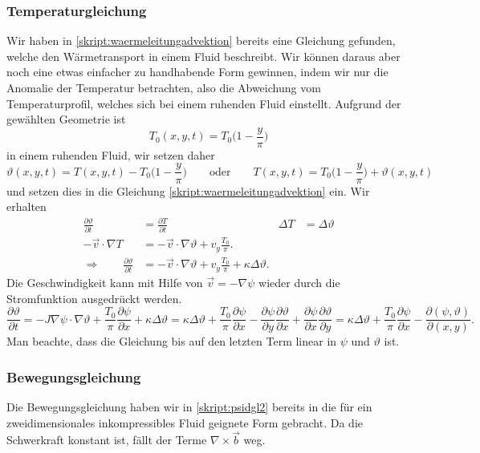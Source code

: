 \subsubsection{Temperaturgleichung}
Wir haben in \eqref{skript:waermeleitungadvektion}
bereits eine Gleichung gefunden, welche den Wärmetransport in einem 
Fluid beschreibt.
Wir können daraus aber noch eine etwas einfacher zu handhabende Form
gewinnen, indem wir nur die Anomalie der Temperatur betrachten, also
die Abweichung vom Temperaturprofil, welches sich bei einem ruhenden
Fluid einstellt. 
Aufgrund der gewählten Geometrie ist 
\[
T_0(x,y,t)= T_0\biggl(1- \frac{y}{\pi}\biggr)
\]
in einem ruhenden Fluid, wir setzen daher
\[
\vartheta(x,y,t)
= 
T(x,y,t)
-
T_0\biggl(1-\frac{y}{\pi}\biggr)
\qquad\text{oder}\qquad
T(x,y,t)
=
T_0\biggl(1-\frac{y}{\pi}\biggr)
+
\vartheta(x,y,t)
\]
und setzen dies in die Gleichung \eqref{skript:waermeleitungadvektion}
ein.
Wir erhalten
\begin{align*}
\frac{\partial\vartheta}{\partial t}
&=
\frac{\partial T}{\partial t}
&
\Delta T
&=
\Delta \vartheta
\\
-\vec{v}\cdot\nabla T
&=
-\vec{v}\cdot\nabla\vartheta
+v_y\frac{T_0}{\pi}.
\\
\Rightarrow
\qquad
\frac{\partial\vartheta}{\partial t}
&=
-\vec{v}\cdot\nabla \vartheta
+v_y\frac{T_0}{\pi}
+
\kappa\Delta \vartheta.
\end{align*}
Die Geschwindigkeit kann mit Hilfe von $\vec{v}=-\nabla \psi$ wieder
durch die Stromfunktion ausgedrückt werden.
\begin{equation}
\frac{\partial\vartheta}{\partial t}
=
-J\nabla\psi\cdot\nabla\vartheta
+\frac{T_0}{\pi}\frac{\partial\psi}{\partial x}
+\kappa\Delta\vartheta
=
\kappa\Delta\vartheta
+\frac{T_0}{\pi}\frac{\partial\psi}{\partial x}
-\frac{\partial \psi}{\partial y}\frac{\partial \vartheta}{\partial x}
+\frac{\partial \psi}{\partial x}\frac{\partial \vartheta}{\partial y}
=
\kappa\Delta\vartheta
+\frac{T_0}{\pi}\frac{\partial\psi}{\partial x}
-
\frac{\partial(\psi,\vartheta)}{\partial(x,y)}.
\label{skript:lorenzthetagl}
\end{equation}
Man beachte, dass die Gleichung bis auf den letzten Term linear 
in $\psi$ und $\vartheta$ ist.

\subsubsection{Bewegungsgleichung}
Die Bewegungsgleichung haben wir in
\eqref{skript:psidgl2}
bereits in die für ein zweidimensionales inkompressibles Fluid
geignete Form gebracht.
Da die Schwerkraft konstant ist, fällt der Terme $\nabla\times\vec{b}$
weg.

